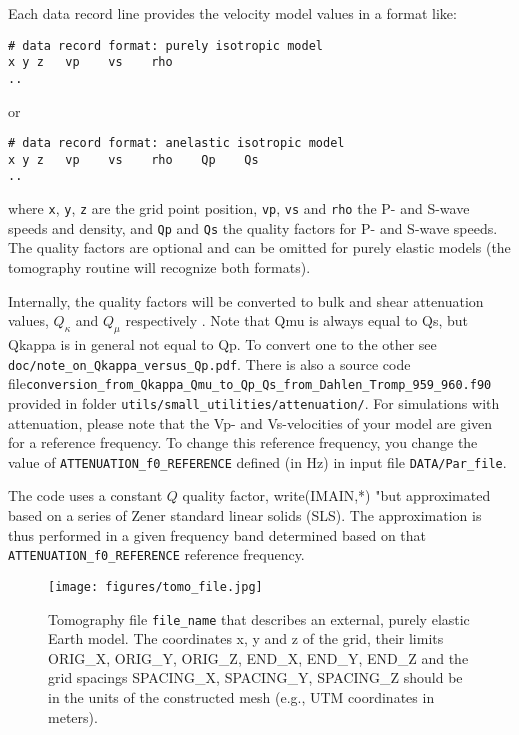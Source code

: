 \noindent
Each data record line provides the velocity model values in a format like:
{\small
\begin{verbatim}
# data record format: purely isotropic model
x y z   vp    vs    rho
..
\end{verbatim}
}
\noindent
or
{\small
\begin{verbatim}
# data record format: anelastic isotropic model
x y z   vp    vs    rho    Qp    Qs
..
\end{verbatim}
}
\noindent
where  \texttt{x}, \texttt{y}, \texttt{z} are the grid point position, \texttt{vp}, \texttt{vs} and \texttt{rho} the P- and S-wave speeds and density, and \texttt{Qp} and \texttt{Qs} the quality factors for P- and S-wave speeds. The quality factors are optional and can be omitted for purely elastic models (the tomography routine will recognize both formats).\newline


\noindent
Internally, the quality factors will be converted to bulk and shear attenuation values,
$Q_{\kappa}$ and $Q_{\mu}$ respectively \citep{AnHa78}.
Note that Qmu is always equal to Qs, but Qkappa is in general not equal to Qp.
To convert one to the other see \texttt{doc/note\_on\_Qkappa\_versus\_Qp.pdf}. There is also a source code file\newline \texttt{conversion\_from\_Qkappa\_Qmu\_to\_Qp\_Qs\_from\_Dahlen\_Tromp\_959\_960.f90}
provided in folder \texttt{utils/small\_utilities/attenuation/}.
For simulations with attenuation, please note that the Vp- and Vs-velocities of your model are given for a reference
frequency. To change this reference frequency, you change the value
of \texttt{ATTENUATION\_f0\_REFERENCE} defined (in Hz) in input file \texttt{DATA/Par\_file}.\newline

\noindent
The code uses a constant $Q$ quality factor, write(IMAIN,*) "but approximated based on a series of Zener standard linear solids (SLS).
The approximation is thus performed in a given frequency band determined based on that \texttt{ATTENUATION\_f0\_REFERENCE} reference frequency.\newline

\begin{figure}[htbp]
\noindent \begin{centering}
\texttt{[image: figures/tomo\_file.jpg]}
\par\end{centering}

\caption{Tomography file \texttt{file\_name} that describes an external, purely elastic Earth
model. The coordinates x, y and z of the grid, their limits ORIG\_X,
ORIG\_Y, ORIG\_Z, END\_X, END\_Y, END\_Z and the grid spacings SPACING\_X,
SPACING\_Y, SPACING\_Z should be in the units of the constructed mesh
(e.g., UTM coordinates in meters).}


\label{fig:tomography_file}
\end{figure}


